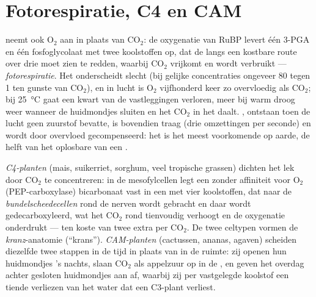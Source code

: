 \section{Fotorespiratie, C4 en CAM}

\begin{proposition}\label{prop:b1:photosynthesis:photorespiration}
 neemt ook $\mathrm{O_2}$ aan in plaats van $\mathrm{CO_2}$: de oxygenatie
van RuBP levert één 3-PGA en één fosfoglycolaat met twee koolstoffen op, dat de
 langs een kostbare route over drie  moet zien te redden, waarbij
$\mathrm{CO_2}$ vrijkomt en  wordt verbruikt --- \emph{fotorespiratie}. Het
 onderscheidt slecht (bij gelijke concentraties ongeveer \qty{80}{} tegen 1
ten gunste van $\mathrm{CO_2}$), en in lucht is $\mathrm{O_2}$ vijfhonderd keer zo
overvloedig als $\mathrm{CO_2}$; bij \qty{25}{\celsius} gaat een kwart van de
vastleggingen verloren, meer bij warm droog weer wanneer de huidmondjes sluiten en
het $\mathrm{CO_2}$ in het  daalt. , ontstaan toen de lucht geen
zuurstof bevatte, is bovendien traag (drie omzettingen per seconde) en wordt door
overvloed gecompenseerd: het is het meest voorkomende  op aarde, de helft van
het oplosbare  van een .
\end{proposition}

\begin{definition}\label{def:b1:photosynthesis:c4cam}
\emph{C4-planten} (mais, suikerriet, sorghum, veel tropische grassen) dichten het
lek door $\mathrm{CO_2}$ te concentreren: in de mesofylcellen legt een  zonder
affiniteit voor $\mathrm{O_2}$ (PEP-carboxylase) bicarbonaat vast in een  met
vier koolstoffen, dat naar de \emph{bundelscheedecellen} rond de nerven wordt
gebracht en daar wordt gedecarboxyleerd, wat het $\mathrm{CO_2}$ rond 
tienvoudig verhoogt en de oxygenatie onderdrukt --- ten koste van twee extra 
per $\mathrm{CO_2}$. De twee celtypen vormen de \emph{kranz}-anatomie (``krans'').
\emph{CAM-planten} (cactussen, ananas, agaven) scheiden diezelfde twee stappen in
de tijd in plaats van in de ruimte: zij openen hun huidmondjes 's nachts, slaan
$\mathrm{CO_2}$ als appelzuur op in de , en geven het overdag achter
gesloten huidmondjes aan  af, waarbij zij per vastgelegde koolstof een
tiende verliezen van het water dat een C3-plant verliest.
\end{definition}

